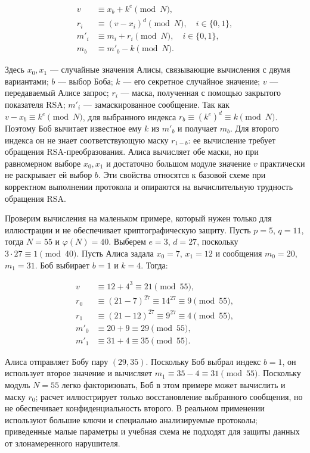 \begin{equation}
\begin{aligned}
v &\equiv x_b + k^e \pmod N, \\
r_i &\equiv (v-x_i)^d \pmod N, \quad i\in\{0,1\}, \\
m'_i &\equiv m_i + r_i \pmod N, \quad i\in\{0,1\}, \\
m_b &\equiv m'_b-k \pmod N.
\end{aligned}
\end{equation}

Здесь \(x_0,x_1\) --- случайные значения Алисы, связывающие вычисления с двумя вариантами; \(b\) --- выбор Боба; \(k\) --- его секретное случайное значение; \(v\) --- передаваемый Алисе запрос; \(r_i\) --- маска, полученная с помощью закрытого показателя RSA; \(m'_i\) --- замаскированное сообщение. Так как \(v-x_b\equiv k^e\pmod N\), для выбранного индекса \(r_b\equiv(k^e)^d\equiv k\pmod N\). Поэтому Боб вычитает известное ему \(k\) из \(m'_b\) и получает \(m_b\). Для второго индекса он не знает соответствующую маску \(r_{1-b}\): ее вычисление требует обращения RSA-преобразования. Алиса вычисляет обе маски, но при равномерном выборе \(x_0,x_1\) и достаточно большом модуле значение \(v\) практически не раскрывает ей выбор \(b\). Эти свойства относятся к базовой схеме при корректном выполнении протокола и опираются на вычислительную трудность обращения RSA.

Проверим вычисления на маленьком примере, который нужен только для иллюстрации и не обеспечивает криптографическую защиту. Пусть \(p=5\), \(q=11\), тогда \(N=55\) и \(\varphi(N)=40\). Выберем \(e=3\), \(d=27\), поскольку \(3\cdot27\equiv1\pmod{40}\). Пусть Алиса задала \(x_0=7\), \(x_1=12\) и сообщения \(m_0=20\), \(m_1=31\). Боб выбирает \(b=1\) и \(k=4\). Тогда:

\begin{equation}
\begin{aligned}
v &\equiv 12+4^3 \equiv 21 \pmod{55}, \\
r_0 &\equiv (21-7)^{27} \equiv 14^{27} \equiv 9 \pmod{55}, \\
r_1 &\equiv (21-12)^{27} \equiv 9^{27} \equiv 4 \pmod{55}, \\
m'_0 &\equiv 20+9 \equiv 29 \pmod{55}, \\
m'_1 &\equiv 31+4 \equiv 35 \pmod{55}.
\end{aligned}
\end{equation}

Алиса отправляет Бобу пару \((29,35)\). Поскольку Боб выбрал индекс \(b=1\), он использует второе значение и вычисляет \(m_1\equiv35-4\equiv31\pmod{55}\). Поскольку модуль \(N=55\) легко факторизовать, Боб в этом примере может вычислить и маску \(r_0\); расчет иллюстрирует только восстановление выбранного сообщения, но не обеспечивает конфиденциальность второго. В реальном применении используют большие ключи и специально анализируемые протоколы; приведенные малые параметры и учебная схема не подходят для защиты данных от злонамеренного нарушителя.


